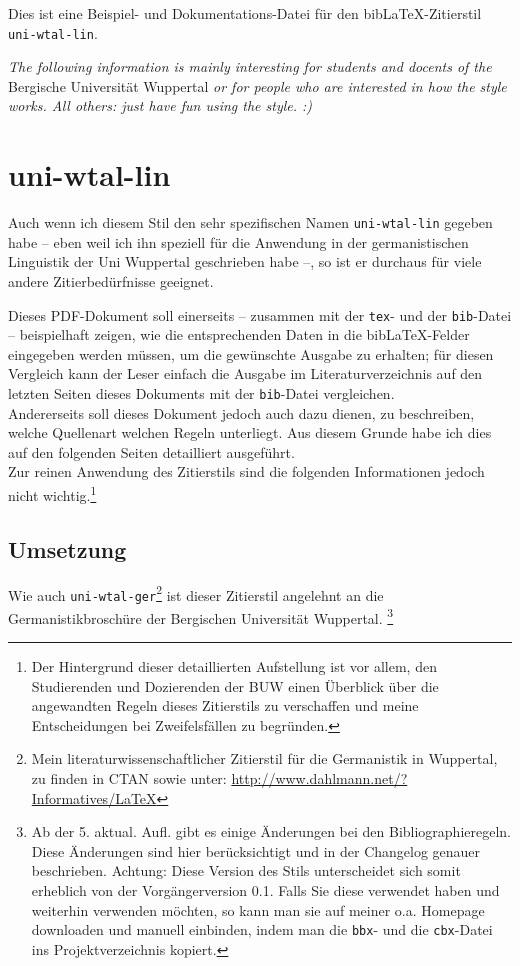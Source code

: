 \documentclass[12pt,notitlepage,parskip]{scrartcl}
\begin{document}
Dies ist eine Beispiel- und Dokumentations-Datei für den bib\LaTeX-Zitierstil
\texttt{uni-wtal-lin}.

\textit{The following information is mainly interesting for students and docents
of the} Bergische Universität Wuppertal \textit{or for people who are
interested in how the style works. All others: just have fun using the style.
:)}

\section{uni-wtal-lin}
Auch wenn ich diesem Stil den sehr spezifischen Namen \texttt{uni-wtal-lin}
gegeben habe – eben weil ich ihn speziell für die Anwendung in der
germanistischen Linguistik der Uni Wuppertal geschrieben habe –, so
ist er durchaus für viele andere Zitierbedürfnisse geeignet.

Dieses PDF-Dokument soll einerseits – zusammen mit der \texttt{tex}- und der
\texttt{bib}-Datei – beispielhaft zeigen, wie die entsprechenden Daten in die
bib\LaTeX-Felder eingegeben werden müssen, um die gewünschte Ausgabe zu
erhalten; für diesen Vergleich kann der Leser einfach die Ausgabe im
Literaturverzeichnis auf den letzten Seiten dieses Dokuments mit der
\texttt{bib}-Datei vergleichen.\\
Andererseits soll dieses Dokument jedoch auch dazu dienen, zu beschreiben,
welche Quellenart welchen Regeln unterliegt. Aus diesem Grunde habe ich dies auf
den folgenden Seiten detailliert ausgeführt.\\
Zur reinen Anwendung des Zitierstils sind die folgenden Informationen jedoch
nicht wichtig.\footnote{Der Hintergrund dieser detaillierten Aufstellung ist vor
allem, den Studierenden und Dozierenden der BUW einen Überblick über die
angewandten Regeln dieses Zitierstils zu verschaffen und meine Entscheidungen
bei Zweifelsfällen zu begründen.}

\subsection{Umsetzung}
Wie auch \texttt{uni-wtal-ger}\footnote{Mein literaturwissenschaftlicher
Zitierstil für die Germanistik in Wuppertal, zu finden in CTAN sowie unter:
\url{http://www.dahlmann.net/?Informatives/LaTeX}} ist dieser Zitierstil
angelehnt an die Germanistikbroschüre der Bergischen Universität Wuppertal.
\parencite[Vgl.][43–45]{germanistik}\footnote{Ab der 5. aktual. Aufl. gibt es
einige Änderungen bei den Bibliographieregeln. Diese Änderungen sind hier
berücksichtigt und in der Changelog genauer beschrieben. Achtung:
Diese Version des Stils unterscheidet sich somit erheblich von der
Vorgängerversion 0.1. Falls Sie diese verwendet haben und weiterhin verwenden
möchten, so kann man sie auf meiner o.a. Homepage downloaden und manuell
einbinden, indem man die
\texttt{bbx}- und die \texttt{cbx}-Datei ins Projektverzeichnis kopiert.}
\end{document}

